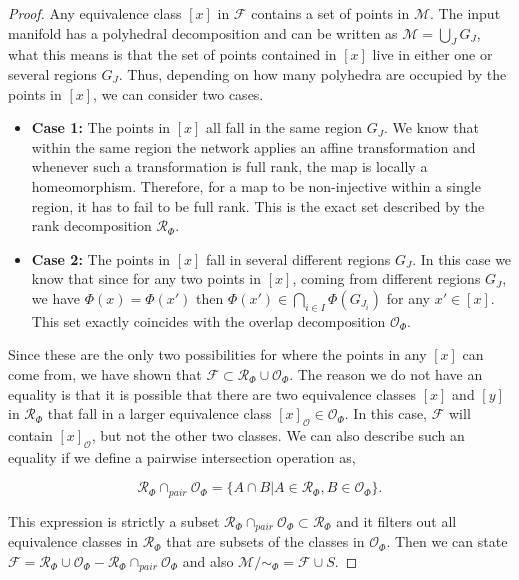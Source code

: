 \documentclass[10pt]{article} %
\theoremstyle{plain}
\theoremstyle{definition}
\theoremstyle{remark}
\begin{document}
\begin{proof}
    Any equivalence class $[x]$ in $\mathcal{F}$ contains a set of points in $\mathcal{M}$. The input manifold has a polyhedral decomposition and can be written as $\mathcal{M} = \bigcup\limits_J G_J$, what this means is that the set of points contained in $[x]$ live in either one or several regions $G_J$. Thus, depending on how many polyhedra are occupied by the points in $[x]$, we can consider two cases.

    \begin{itemize}
        \item \textbf{Case 1:} The points in $[x]$ all fall in the same region $G_J$. We know that within the same region the network applies an affine transformation and whenever such a transformation is full rank, the map is locally a homeomorphism. Therefore, for a map to be non-injective within a single region, it has to fail to be full rank. This is the exact set described by the rank decomposition $\mathcal{R}_\Phi$.
        \item \textbf{Case 2:} The points in $[x]$ fall in several different regions $G_J$. In this case we know that since for any two points in $[x]$, coming from different regions $G_J$, we have $\Phi(x)=\Phi(x')$ then $\Phi(x') \in \bigcap\limits_{i \in I} \Phi(G_{J_i})$ for any $x' \in [x]$. This set exactly coincides with the overlap decomposition $\mathcal{O}_\Phi$.
    \end{itemize}
    Since these are the only two possibilities for where the points in any $[x]$ can come from, we have shown that $\mathcal{F} \subset \mathcal{R}_\Phi \cup \mathcal{O}_\Phi$. 
    The reason we do not have an equality is that it is possible that there are two equivalence classes $[x]$ and $[y]$ in $\mathcal{R}_\Phi$ that fall in a larger equivalence class $[x]_\mathcal{O} \in \mathcal{O}_\Phi$. In this case, $\mathcal{F}$ will contain $[x]_\mathcal{O}$, but not the other two classes. We can also describe such an equality if we define a pairwise intersection operation as,

    \begin{equation*}
        \mathcal{R}_\Phi\cap_{pair}\mathcal{O}_\Phi = \{A\cap B| A \in\mathcal{R}_\Phi, B\in \mathcal{O}_\Phi\}.
    \end{equation*}

    This expression is strictly a subset $\mathcal{R}_\Phi\cap_{pair}\mathcal{O}_\Phi \subset\mathcal{R}_\Phi$ and it filters out all equivalence classes in $\mathcal{R}_\Phi$ that are subsets of the classes in $\mathcal{O}_\Phi$. Then we can state $\mathcal{F} = \mathcal{R}_\Phi \cup \mathcal{O}_\Phi - \mathcal{R}_\Phi\cap_{pair}\mathcal{O}_\Phi$ and also $\mathcal{M}/\sim_\Phi = \mathcal{F}\cup S$.
\end{proof}
\end{document}
